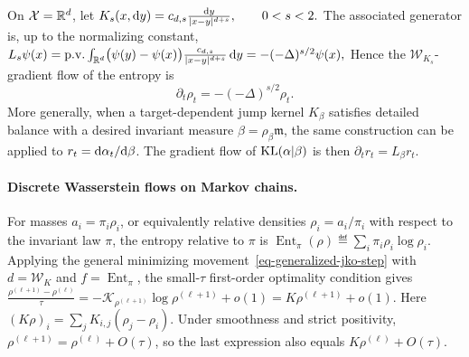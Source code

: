 On \(\mathcal X=\mathbb{R}^d\), let
\(K_s(x,\mathrm{d} y) = c_{d,s}\frac{\mathrm{d} y}{|x-y|^{d+s}}, \qquad 0<s<2.\)
The associated generator is, up to the normalizing constant, \(L_s\psi(x) = \mathrm{p.v.}\int_{\mathbb{R}^d} \bigl(\psi(y)-\psi(x)\bigr) \frac{c_{d,s}}{|x-y|^{d+s}}\,\mathrm{d} y = -(-\Delta)^{s/2}\psi(x),\)
Hence the \(\mathcal W_{K_s}\)-gradient flow of the entropy is
\begin{equation}\label{eq-fractional-heat-nonlocal-wasserstein}
\partial_t\rho_t
=
-(-\Delta)^{s/2}\rho_t.
\end{equation}
More generally, when a target-dependent jump kernel \(K_\beta\) satisfies detailed balance with a desired invariant measure \(\beta=\rho_\beta\mathfrak m\), the same construction can be applied to \(r_t=\mathrm{d}\alpha_t/\mathrm{d}\beta\). The gradient flow of \(\operatorname{KL}(\alpha|\beta)\) is then \(\partial_t r_t=L_\beta r_t\).

\paragraph{Discrete Wasserstein flows on Markov chains.}
For masses \(a_i=\pi_i\rho_i\), or equivalently relative densities \(\rho_i=a_i/\pi_i\) with respect to the invariant law \(\pi\), the entropy relative to \(\pi\) is
\(\operatorname{Ent}_\pi(\rho)\eqdef\sum_i\pi_i\rho_i\log\rho_i.\)
Applying the general minimizing movement~\eqref{eq-generalized-jko-step} with \(d=\mathcal W_K\) and \(f=\operatorname{Ent}_\pi\), the small-\(\tau\) first-order optimality condition gives
\(\frac{\rho^{(\ell+1)}-\rho^{(\ell)}}{\tau} =-\mathcal K_{\rho^{(\ell+1)}}\log\rho^{(\ell+1)}+o(1) =K\rho^{(\ell+1)}+o(1).\)
Here \((K\rho)_i=\sum_jK_{i,j}(\rho_j-\rho_i)\). Under smoothness and strict positivity, $\rho^{(\ell+1)}=\rho^{(\ell)}+O(\tau)$, so the last expression also equals $K\rho^{(\ell)}+O(\tau)$.

